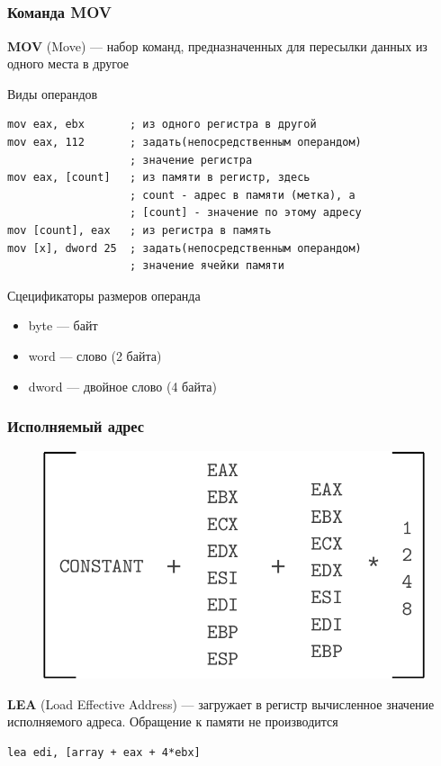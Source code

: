 \documentclass{beamer}
\begin{document}
    \subsection{}
    \begin{frame}[fragile]
        \frametitle{Команда MOV}
        {\bf MOV} (Move) --- набор команд, предназначенных для пересылки данных из одного места в другое
        \begin{block}{Виды операндов}\small
        \begin{verbatim}
mov eax, ebx       ; из одного регистра в другой
mov eax, 112       ; задать(непосредственным операндом)
                   ; значение регистра
mov eax, [count]   ; из памяти в регистр, здесь
                   ; count - адрес в памяти (метка), а
                   ; [count] - значение по этому адресу
mov [count], eax   ; из регистра в память
mov [x], dword 25  ; задать(непосредственным операндом)
                   ; значение ячейки памяти\end{verbatim}
        \end{block}
        \begin{block}{Сцецификаторы размеров операнда}\footnotesize
        \begin{itemize}
            \item byte --- байт
            \item word --- слово (2 байта)
            \item dword --- двойное слово (4 байта)
        \end{itemize}
        \end{block}
\end{frame}
    \begin{frame}[fragile]
        \frametitle{Исполняемый адрес}
        \begin{figure}
        \includegraphics[width=0.7\linewidth]{fig/effective_addr.pdf}
        \end{figure}
        {\bf LEA} (Load Effective Address) --- загружает в регистр вычисленное значение исполняемого адреса. Обращение к памяти не производится
        \begin{verbatim}
lea edi, [array + eax + 4*ebx]
        \end{verbatim}
\end{frame}
\end{document}
